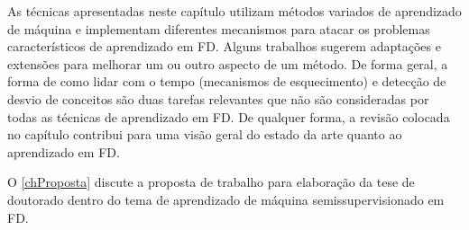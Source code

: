 As técnicas apresentadas neste capítulo utilizam métodos variados de aprendizado de máquina e implementam diferentes mecanismos para atacar os problemas característicos de aprendizado em FD. Alguns trabalhos sugerem adaptações e extensões para melhorar um ou outro aspecto de um método. De forma geral, a forma de como lidar com o tempo (mecanismos de esquecimento) e detecção de desvio de conceitos são duas tarefas relevantes que não são consideradas por todas as técnicas de aprendizado em FD. De qualquer forma, a revisão colocada no capítulo contribui para uma visão geral do estado da arte quanto ao aprendizado em FD.

O \autoref{chProposta} discute a proposta de trabalho para elaboração da tese de doutorado dentro do tema de aprendizado de máquina semissupervisionado em FD.